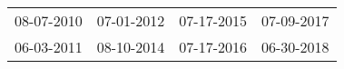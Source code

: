 \begin{supertabular}{llll}
 08-07-2010 &  07-01-2012 &  07-17-2015 &  07-09-2017 \\
 06-03-2011 &  08-10-2014 &  07-17-2016 &  06-30-2018 \\
\end{supertabular}
